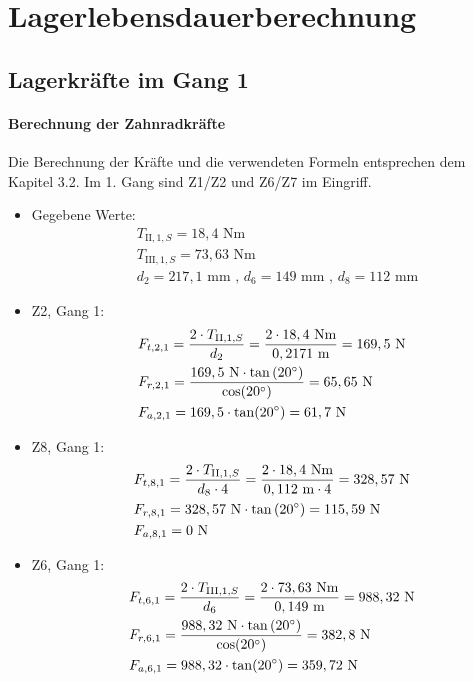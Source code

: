 \newpage
\chapter{Lagerlebensdauerberechnung}
\section{Lagerkräfte im Gang 1}
\subsubsection{Berechnung der Zahnradkräfte}
Die Berechnung der Kräfte und die verwendeten Formeln entsprechen dem Kapitel 3.2. Im 1. Gang sind Z1/Z2 und Z6/Z7 im Eingriff.
\begin{itemize}
\item Gegebene Werte: 
	\begin{align*}
	&T_{\mathrm{II},1,S} = 18,4\text{ Nm} \\
	&T_{\mathrm{III},1,S} = 73,63\text{ Nm} \\	
	&d_2 = 217,1\text{ mm} \text{ , } d_6 = 149 \text{ mm , } d_8 = 112 \text{ mm}
	\end{align*}
\item Z2, Gang 1:
	\begin{align*} 
	&F_{t,2,1} = \frac{2\cdot T_{\mathrm{II},1,S}}{d_2} = \frac{2 \cdot 18,4 \text{ Nm}}{0,2171 \text{ m}} = 169,5 \text{ N}\\ 
	&F_{r,2,1} = \frac{169,5 \text{ N} \cdot \tan{(20^\circ)}}{\cos(20^\circ)} = 65,65\text{ N}\\ 
	&F_{a,2,1} =169,5 \cdot \tan(20^\circ) =61,7 \text{ N}
	\end{align*}
\item Z8, Gang 1:
	\begin{align*}
	&F_{t,8,1} = \frac{2\cdot T_{\mathrm{II},1,S}}{d_8 \cdot 4} = \frac{2 \cdot 18,4 \text{ Nm}}{0,112 \text{ m} \cdot 4} = 328,57\text{ N}\\ 
	&F_{r,8,1} = 328,57 \text{ N} \cdot \tan{(20^\circ)} = 115,59\text{ N}\\ 
	&F_{a,8,1} =0 \text{ N}
	\end{align*}
\item Z6, Gang 1:
	\begin{align*} 
	&F_{t,6,1} = \frac{2\cdot T_{\mathrm{III},1,S}}{d_6} = \frac{2 \cdot 73,63 \text{ Nm}}{0,149 \text{ m}} = 988,32 \text{ N}\\ 
	&F_{r,6,1} = \frac{988,32 \text{ N} \cdot \tan{(20^\circ)}}{\cos(20^\circ)} = 382,8\text{ N}\\ 
	&F_{a,6,1} =988,32 \cdot \tan(20^\circ) =359,72 \text{ N}
	\end{align*}
\end{itemize}
